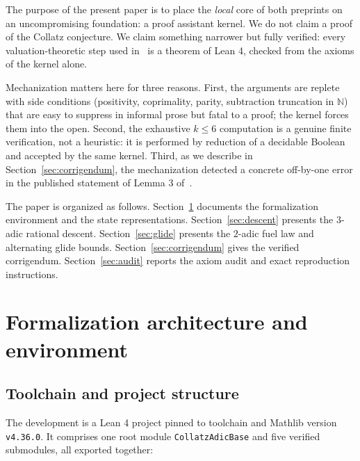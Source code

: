 \documentclass[11pt,a4paper]{article}
\begin{document}
The purpose of the present paper is to place the \emph{local} core of both
preprints on an uncompromising foundation: a proof assistant kernel.  We do not
claim a proof of the Collatz conjecture.  We claim something narrower but fully
verified: every valuation-theoretic step used in~\cite{paper1,paper2} is a
theorem of Lean 4, checked from the axioms of the kernel alone.

Mechanization matters here for three reasons.  First, the arguments are replete
with side conditions (positivity, coprimality, parity, subtraction truncation in
$\mathbb{N}$) that are easy to suppress in informal prose but fatal to a proof;
the kernel forces them into the open.  Second, the exhaustive $k\le 6$
computation is a genuine finite verification, not a heuristic: it is performed
by reduction of a decidable Boolean and accepted by the same kernel.  Third,
as we describe in Section~\ref{sec:corrigendum}, the mechanization detected a
concrete off-by-one error in the published statement of Lemma 3 of~\cite{paper2}.

The paper is organized as follows.  Section~\ref{sec:arch} documents the
formalization environment and the state representations.  Section~\ref{sec:descent}
presents the $3$-adic rational descent.  Section~\ref{sec:glide} presents the
$2$-adic fuel law and alternating glide bounds.  Section~\ref{sec:corrigendum}
gives the verified corrigendum.  Section~\ref{sec:audit} reports the axiom audit
and exact reproduction instructions.

\section{Formalization architecture and environment}
\label{sec:arch}

\subsection{Toolchain and project structure}

The development is a Lean 4 project pinned to toolchain and Mathlib version
\texttt{v4.36.0}.  It comprises one root module \texttt{CollatzAdicBase} and five
verified submodules, all exported together:
\end{document}
